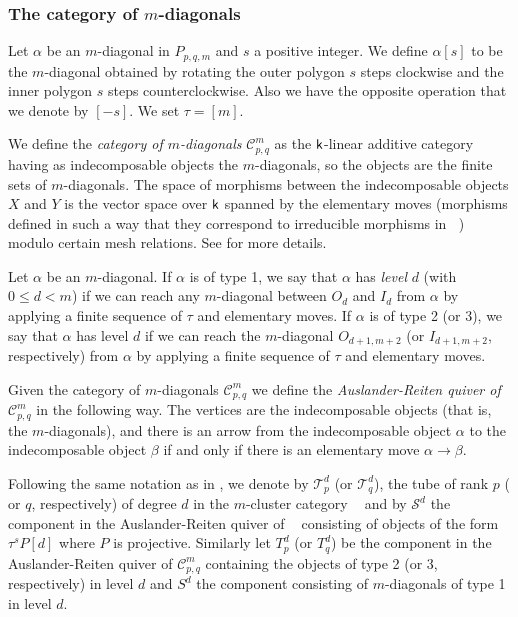 \documentclass{amsart}
\theoremstyle{plain}
\theoremstyle{definition}
\begin{document}
\subsubsection{The category of $m$-diagonals } Let $\alpha$ be an $m$-diagonal in $P_{p,q,m}$ and $s$ a positive integer. We define $\alpha[s]$ to be the $m$-diagonal obtained by rotating the outer polygon $s$ steps clockwise and the inner polygon $s$ steps counterclockwise. Also we have the opposite operation that we denote by $[-s]$. We set $\tau=[m]$.

We define the \emph{category of $m$-diagonals} $\mathcal{C}^m_{p,q}$
as the ${{\normalfont{\textsf{k}}}}$-linear additive category having as indecomposable objects the $m$-diagonals,  so the objects are the finite sets of $m$-diagonals. The space of morphisms between the indecomposable objects   $X$ and $Y$ is the vector space over ${{\normalfont{\textsf{k}}}}$ spanned by the elementary moves  (morphisms defined in such a way that they correspond to irreducible morphisms in ${\mathop{\mathcal{C}_m}\nolimits}$) modulo certain mesh relations. See \cite[Section 6]{T12-arxiv} for more details.

Let $\alpha$ be an $m$-diagonal. If $\alpha$ is of type 1, we say that
$\alpha$ has \textit{level}  $d$ (with $0 \leq d <m$) if we can reach any
$m$-diagonal between $O_d$ and $I_d$ from $\alpha$ by applying a finite sequence of $\tau$ and elementary moves. If $\alpha$ is of type  2 (or 3), we say that $\alpha$ has level
 $d$  if we can reach the $m$-diagonal $O_{d+1,m+2}$ (or $I_{d+1,m+2}$, respectively)
from $\alpha$ by applying a finite sequence of  $\tau$ and elementary moves.

Given  the category of $m$-diagonals $\mathcal{C}^m_{p,q}$ we define the \emph{Auslander-Reiten quiver of $\mathcal{C}^m_{p,q}$} in the following way. The vertices are the indecomposable objects (that is,  the $m$-diagonals), and there is an arrow from the indecomposable object $\alpha$ to the indecomposable object $\beta$ if and only if there is an elementary move $\alpha \rightarrow \beta$. 

Following the same notation as in  \cite{T12-arxiv}, we denote by  $\mathcal{T}_p^d$ (or $\mathcal{T}_q^d$), the tube of rank $p$ ( or $q$, respectively) of degree  $d$ in the  $m$-cluster category ${\mathop{\mathcal{C}_m}\nolimits}$ and  by  $\mathcal{S}^d$ the component in the Auslander-Reiten  quiver of ${\mathop{\mathcal{C}_m}\nolimits}$ consisting of  objects of the form $\tau^sP[d]$ where $P$ is   projective. Similarly let $T^d_p$ (or $T^d_q$) be the component in the Auslander-Reiten  quiver of $\mathcal{C}^m_{p,q}$ containing the objects of type 2 (or 3, respectively) in level $d$ and $S^d$ the component consisting of $m$-diagonals of type 1 in level $d$.
\end{document}
